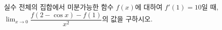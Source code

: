 실수 전체의 집합에서 미분가능한 함수 $f(x)$에 대하여 $f'(1)=10$일 때, $\displaystyle\lim_{x\to 0}\dfrac{f(2-\cos x)-f(1)}{x^2}$의 값을 구하시오.
